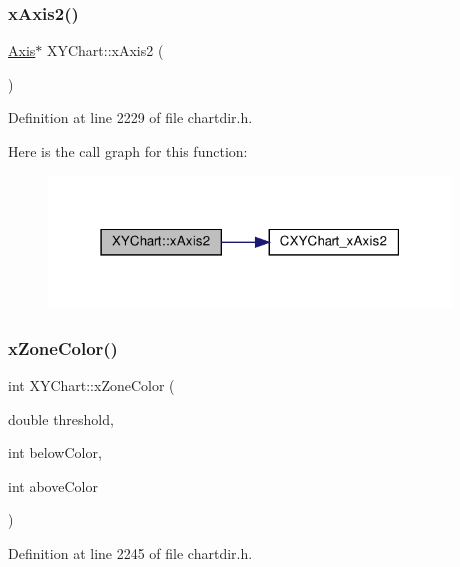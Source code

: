 \subsubsection{\texorpdfstring{x\+Axis2()}{xAxis2()}}
{\footnotesize\ttfamily \hyperlink{class_axis}{Axis}$\ast$ X\+Y\+Chart\+::x\+Axis2 (\begin{DoxyParamCaption}{ }\end{DoxyParamCaption})\hspace{0.3cm}{\ttfamily [inline]}}



Definition at line 2229 of file chartdir.\+h.

Here is the call graph for this function\+:
\nopagebreak
\begin{figure}[H]
\begin{center}
\leavevmode
\includegraphics[width=303pt]{class_x_y_chart_a9883db03a403936680d0c57bdd16eb94_cgraph}
\end{center}
\end{figure}
\mbox{\label{class_x_y_chart_adb04681a52549d78517588c01556871f}} 
\subsubsection{\texorpdfstring{x\+Zone\+Color()}{xZoneColor()}}
{\footnotesize\ttfamily int X\+Y\+Chart\+::x\+Zone\+Color (\begin{DoxyParamCaption}\item[{double}]{threshold,  }\item[{int}]{below\+Color,  }\item[{int}]{above\+Color }\end{DoxyParamCaption})\hspace{0.3cm}{\ttfamily [inline]}}



Definition at line 2245 of file chartdir.\+h.

